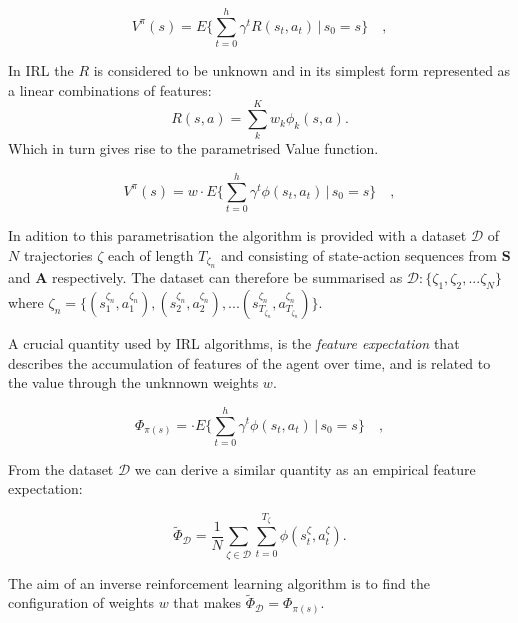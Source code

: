 \documentclass[letterpaper]{article}
\begin{document}
\begin{equation}
 V^\pi(s) = E\{\sum_{t = 0}^h \gamma^tR(s_t,a_t)\,\vert\, s_0 = s\}\quad,
\end{equation}

In IRL the $R$ is considered to be unknown and in its simplest form represented as a linear combinations of features:
\begin{equation}
R(s,a) = \sum_k^Kw_k\phi_k(s,a). \label{eq:rew}
\end{equation}
Which in turn gives rise to the parametrised Value function.

\begin{equation}
 	V^\pi(s) = w \cdot E\{\sum_{t = 0}^h \gamma^t\phi(s_t,a_t)\,\vert\, s_0 = s\}\quad,
\end{equation}

In adition to this parametrisation the algorithm is provided with a dataset ${\mathcal{D}}$ of $N$ trajectories $\zeta$ each of length $T_{\zeta_n}$ and consisting of state-action sequences from $\mathbf{S}$ and $\mathbf{A}$ respectively. The dataset can therefore be summarised as $\mathcal{D}:\big\{ \zeta_1,\zeta_2,...\zeta_N \big\}$ where $\zeta_n = \{(s^{\zeta_n}_1,a^{\zeta_n}_1),(s^{\zeta_n}_2,a^{\zeta_n}_2),...(s^{\zeta_n}_{T_{\zeta_n}},a^{\zeta_n}_{T_{\zeta_n}})\}$. 

A crucial quantity used by IRL algorithms, is the \emph{feature expectation} that describes the accumulation of features of the agent over time, and is related to the value through the unknnown weights $w$. 

\begin{equation}
 	\Phi_{\pi(s)} = \cdot E\{\sum_{t = 0}^h \gamma^t\phi(s_t,a_t)\,\vert\, s_0 = s\}\quad, \label{eqn:model_fe}
\end{equation}

From the dataset ${\mathcal{D}}$ we can derive a similar quantity as an empirical feature expectation:

\begin{equation}
	\widetilde{\Phi}_{\mathcal{D}} =\frac{1}{N}\sum_{\zeta\in\mathcal{D}}\sum_{t=0}^{T_{\zeta}}\phi(s^\zeta_t,a^\zeta_t). \label{eqn:empirical_fe}
\end{equation}

The aim of an inverse reinforcement learning algorithm is to find the configuration of weights $w$ that makes $\widetilde{\Phi}_{\mathcal{D}} = \Phi_{\pi(s)}$. 
\end{document}
